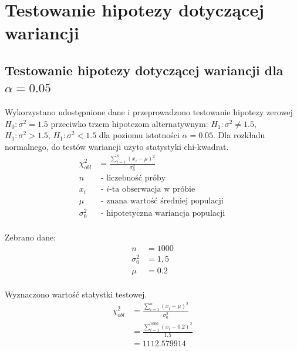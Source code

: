 \documentclass[12pt, a4paper]{article}
\begin{document}
	\section{Testowanie hipotezy dotyczącej wariancji}	
	\subsection{Testowanie hipotezy dotyczącej wariancji dla $\alpha =0.05$}	
		Wykorzystano udostępnione dane i przeprowadzono testowanie hipotezy zerowej $H_0:\sigma^2=1.5$ przeciwko trzem hipotezom alternatywnym: $H_1:\sigma^2\neq1.5$, $H_1:\sigma^2>1.5$, $H_1:\sigma^2<1.5$ dla poziomu istotności $\alpha =0.05$. Dla rozkładu normalnego, do testów wariancji użyto statystyki chi-kwadrat.\\
		\[
		\begin{aligned}
			\chi^2_{obl} &= \frac{\sum_{i=1}^{n}(x_i-\mu)^2}{\sigma_0^2} \\
			n &\text{ - liczebność próby} \\
			x_i &\text{ - } i\text{-ta obserwacja w próbie} \\
			\mu &\text{ - znana wartość średniej populacji } \\
			\sigma_0^2 &\text{ - hipotetyczna wariancja populacji} \\
		\end{aligned}
		\]
		
		Zebrano dane:
		\[
		\begin{aligned}
			n&=1000\\
			\sigma_0^2&=1,5\\
			\mu&=0.2\\
		\end{aligned}
		\]
		
		Wyznaczono wartość statystki testowej.\\
		\[
		\begin{aligned}
			\chi^2_{obl}
			&= \frac{\sum_{i=1}^{n}(x_i-\mu)^2}{\sigma_0^2}\\
			&= \frac{\sum_{i=1}^{1000}(x_i-0.2)^2}{1.5}\\
			&= 1112.579914
		\end{aligned}
		\]
		
\end{document}
